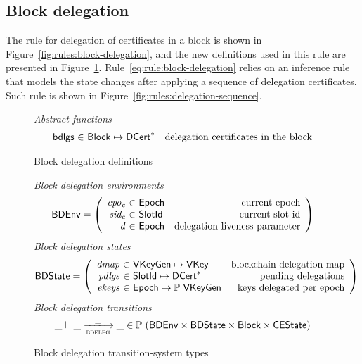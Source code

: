 \subsection{Block delegation}
\label{sec:block-delegation}

The rule for delegation of certificates in a block is shown in
Figure~\ref{fig:rules:block-delegation}, and the new definitions used in this
rule are presented in Figure~\ref{fig:defs:block-delegation}.
Rule~\ref{eq:rule:block-delegation} relies on an inference rule that models the
state changes after applying a sequence of delegation certificates. Such rule
is shown in Figure~\ref{fig:rules:delegation-sequence}.

\begin{figure}
  \emph{Abstract functions}
  \begin{equation*}
    \begin{array}{r@{~\in~}lr}
      \fun{bdlgs} & \Block \mapsto \seqof{\DCert} & \text{delegation certificates in the block}\\
    \end{array}
  \end{equation*}
  \caption{Block delegation definitions}
  \label{fig:defs:block-delegation}
\end{figure}

\begin{figure}
  \emph{Block delegation environments}
  \begin{equation*}
    \BDEnv =
    \left(
      \begin{array}{r@{~\in~}lr}
        \var{epo_c} & \Epoch & \text{current epoch}\\
        \var{sid_c} & \SlotId & \text{current slot id}\\
        \var{d} & \Epoch & \text{delegation liveness parameter}\\
      \end{array}
    \right)
  \end{equation*}
  \emph{Block delegation states}
  \begin{equation*}
    \BDState =
    \left(
      \begin{array}{r@{~\in~}lr}
        \var{dmap} & \VKeyGen \mapsto \VKey & \text{blockchain delegation map}\\
        \var{pdlgs} & \SlotId \mapsto \seqof{\DCert} & \text{pending delegations}\\
        \var{ekeys} & \Epoch \mapsto \powerset{\VKeyGen} & \text{keys delegated per epoch}
      \end{array}
    \right)
  \end{equation*}
  \emph{Block delegation transitions}
  \begin{equation*}
    \_ \vdash \_ \trans{bdeleg}{\_} \_ \in
      \powerset (\BDEnv \times \BDState \times \Block \times \CEState)
  \end{equation*}
  \caption{Block delegation transition-system types}
  \label{fig:ts-types:block-delegation}
\end{figure}

